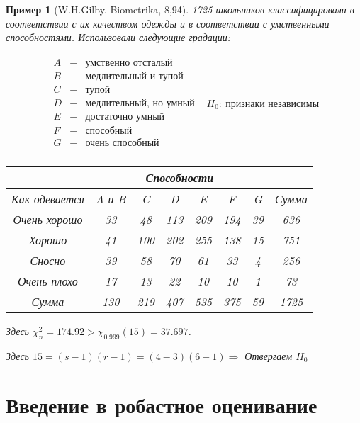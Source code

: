 \documentclass[12pt]{article}
\newtheorem*{example}{Пример}
\theoremstyle{basic_theorem}
\theoremstyle{name_theorem}
\begin{document}
\begin{example}[W.H.Gilby. Biometrika, 8,94]
    1725 школьников классифицировали в соответствии с их
    качеством одежды и в соответствии с умственными способностями.
    Использовали следующие градации:
    
    \[
    \begin{array}{lr}
        \begin{array}{lcl}
            A &-& \text{умственно отсталый} \\
            B &-& \text{медлительный и тупой} \\
            C &-& \text{тупой} \\
            D &-& \text{медлительный, но умный} \\
            E &-& \text{достаточно умный} \\
            F &-& \text{способный} \\
            G &-& \text{очень способный} \\
        \end{array} & 
        \boxed{H_0:\ \text{признаки независимы}}
    \end{array}
    \]
    \begin{table}[h]
        \centering
        \begin{tabular}{ c|c|c|c|c|c|c|c }
            & \multicolumn{6}{|c|}{Способности} & \\ \hline
            Как одевается & A и B & C   & D   & E   & F   & G  & Сумма \\ \hline
            Очень хорошо  &  33   & 48  & 113 & 209 & 194 & 39 & 636   \\ \hline
            Хорошо        &  41   & 100 & 202 & 255 & 138 & 15 & 751   \\ \hline
            Сносно        &  39   & 58  & 70  & 61  & 33  & 4  & 256   \\ \hline
            Очень плохо   &  17   & 13  & 22  & 10  & 10  & 1  & 73    \\ \hline
            Сумма         &  130  & 219 & 407 & 535 & 375 & 59 & 1725
        \end{tabular}
    \end{table}

    Здесь $\chi_n^2=174.92>\chi_{0.999}(15)=37.697$. \par
    Здесь $15 = (s-1)(r-1) = (4-3)(6-1) \Rightarrow$ Отвергаем $H_0$
\end{example}

\section{Введение в робастное оценивание}
\end{document}
